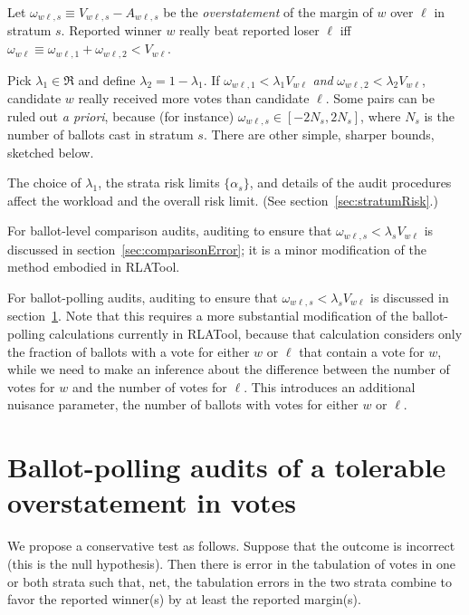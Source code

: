 \documentclass[12pt]{article}
\begin{document}
Let $\omega_{w\ell,s} \equiv V_{w\ell,s} - A_{w\ell,s}$ be the \emph{overstatement}
of the margin of $w$ over $\ell$ in stratum $s$.
Reported winner $w$ really beat reported loser 
$\ell$ iff $\omega_{w\ell} \equiv \omega_{w\ell,1} + \omega_{w\ell,2} < V_{w\ell}$.

Pick $\lambda_1 \in \Re$ and define $\lambda_2 = 1-\lambda_1$.
If $\omega_{w\ell,1} < \lambda_1 V_{w\ell}$ \emph{and} 
$\omega_{w\ell,2} < \lambda_2 V_{w\ell}$, candidate $w$ really received more votes
than candidate $\ell$.
Some pairs can be ruled out \emph{a priori}, because (for instance) $\omega_{w\ell,s} \in [-2N_s, 2N_s]$,
where $N_s$ is the number of ballots cast in stratum $s$.
There are other simple, sharper bounds, sketched below.

The choice of $\lambda_1$, the strata risk limits $\{\alpha_s\}$, and details of the
audit procedures affect the workload and the overall risk limit.
(See section~\ref{sec:stratumRisk}.)

For ballot-level comparison audits, auditing to ensure that $\omega_{w\ell,s} < \lambda_s V_{w\ell}$
is discussed in section~\ref{sec:comparisonError}; it is a minor modification of the method
embodied in RLATool.

For ballot-polling audits, auditing to ensure that $\omega_{w\ell,s} < \lambda_s V_{w\ell}$ is discussed in 
section~\ref{sec:ballotPollError}.
Note that this requires a more substantial modification of the ballot-polling calculations currently in
RLATool, because that calculation considers only the fraction of ballots with a vote for either 
$w$ or $\ell$ that contain a vote for $w$, while we need to make an inference about the 
difference between the number of votes for $w$ and the number of votes for $\ell$.
This introduces an additional nuisance parameter, the number of ballots with votes for either
$w$ or $\ell$.






\section{Ballot-polling audits of a tolerable overstatement in votes}
\label{sec:ballotPollError}

We propose a conservative test as follows. 
Suppose that the outcome is incorrect (this is the null hypothesis).
Then there is error in the tabulation of votes in one or both strata such that, net,
the tabulation errors in the two strata combine to favor the reported winner(s)
by at least the reported margin(s).
\end{document}
